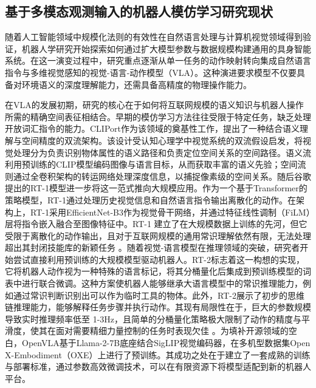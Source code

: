 \subsection{基于多模态观测输入的机器人模仿学习研究现状}

随着人工智能领域中规模化法则的有效性在自然语言处理\cite{devlin2019bert,achiam2023gpt}与计算机视觉领域\cite{oquab2023dinov2,simeoni2025dinov3}得到验证，机器人学研究开始探索如何通过扩大模型参数与数据规模构建通用的具身智能系统。在这一演变过程中，研究重点逐渐从单一任务的动作映射转向集成自然语言指令与多维视觉感知的视觉-语言-动作模型（VLA）。这种演进要求模型不仅要具备对环境语义的深度理解能力，还需具备高精度的物理操作能力。

在VLA的发展初期，研究的核心在于如何将互联网规模的语义知识与机器人操作所需的精确空间表征相结合。早期的模仿学习方法往往受限于特定任务，缺乏处理开放词汇指令的能力。CLIPort\cite{shridhar2022cliport}作为该领域的奠基性工作，提出了一种结合语义理解与空间精度的双流架构。该设计受认知心理学中视觉系统的双流假设启发，将视觉处理分为负责识别物体属性的语义路径和负责定位空间关系的空间路径。语义流利用预训练的CLIP模型编码图像与语言目标，从而获取丰富的语义先验；空间流则通过全卷积架构的转运网络处理深度信息，以捕捉像素级的空间关系。随后谷歌提出的RT-1\cite{brohan2022rt}模型进一步将这一范式推向大规模应用。作为一个基于Transformer的策略模型，RT-1通过处理历史视觉信息和自然语言指令输出离散化的动作。在架构上，RT-1采用EfficientNet-B3\cite{tan2019efficientnet}作为视觉骨干网络，并通过特征线性调制（FiLM）层\cite{perez2018film}将指令嵌入融合至图像特征中。RT-1 建立了在大规模数据上训练的先河，但它受限于离散化的动作输出，且对于互联网规模的通用常识理解依然有限，无法处理超出其封闭技能库的新颖任务 。随着视觉-语言模型\cite{wang2024qwen2,bai2025qwen3}在推理领域的突破，研究者开始尝试直接利用预训练的大规模模型驱动机器人。RT-2\cite{zitkovich2023rt}标志着这一构想的实现，它将机器人动作视为一种特殊的语言标记，将其分桶量化后集成到预训练模型的词表中进行联合微调。这种方案使机器人能够继承大语言模型中的常识推理能力，例如通过常识判断识别出可以作为临时工具的物体。此外，RT-2展示了初步的思维链推理能力，能够解释任务步骤并执行动作。其现有局限性在于，巨大的参数规模导致实时推理频率低至 1-3Hz，且简单的分桶量化策略极大限制了动作的精度与平滑度，使其在面对需要精细力量控制的任务时表现欠佳 。为填补开源领域的空白，OpenVLA\cite{kim2024openvla,kim2025fine}基于Llama-2-7B底座结合SigLIP\cite{tschannen2025siglip}视觉编码器，在多机型数据集Open X-Embodiment（OXE）\cite{o2024open}上进行了预训练。其成功之处在于建立了一套成熟的训练与部署标准，通过参数高效微调技术，可以在有限资源下将模型适配到新的机器人平台。


